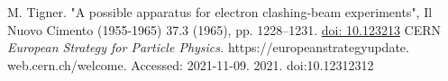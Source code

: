 \documentclass[a4paper,
    keeplastbox,   %
]{jacow}
\begin{document}
    {\printbibliography}%
    {%

        \begin{thebibliography}{99}   %

             M. Tigner.  "A possible apparatus for electron clashing-beam experiments",  Il Nuovo
            Cimento (1955-1965) 37.3 (1965), pp. 1228–1231. \url{doi: 10.123213}
             CERN \textit{European Strategy for Particle Physics. } https://europeanstrategyupdate.
            web.cern.ch/welcome. Accessed: 2021-11-09. 2021. doi:10.12312312



        \end{thebibliography}
    }
%
%

\end{document}
